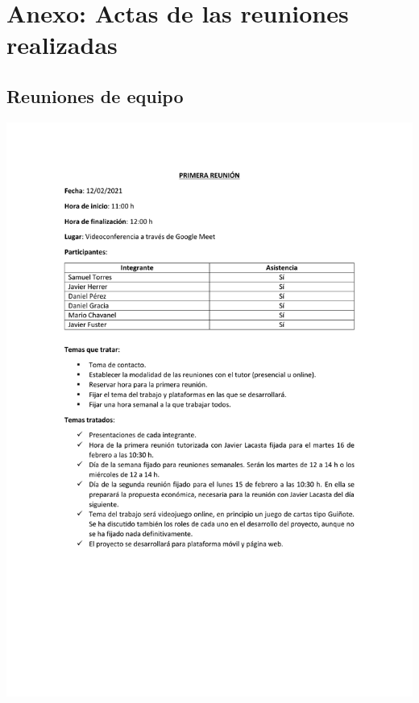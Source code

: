 \documentclass{article}
\begin{document}
\appendix

\section{Anexo: Actas de las reuniones realizadas}

\subsection*{Reuniones de equipo}
\includegraphics[width=\textwidth]{../images/actas/Acta_reunion_1.pdf}
\end{document}
